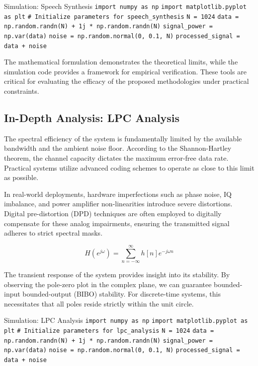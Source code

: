 \begin{pythonbox}{Simulation: Speech Synthesis}
\texttt{import numpy as np}
\texttt{import matplotlib.pyplot as plt}
\texttt{}
\texttt{\# Initialize parameters for speech\_synthesis}
\texttt{N = 1024}
\texttt{data = np.random.randn(N) + 1j * np.random.randn(N)}
\texttt{signal\_power = np.var(data)}
\texttt{noise = np.random.normal(0, 0.1, N)}
\texttt{processed\_signal = data + noise}
\end{pythonbox}

\vspace{0.5cm}
The mathematical formulation demonstrates the theoretical limits, while the simulation code provides a framework for empirical verification. These tools are critical for evaluating the efficacy of the proposed methodologies under practical constraints.


\subsection{In-Depth Analysis: LPC Analysis}
The spectral efficiency of the system is fundamentally limited by the available bandwidth and the ambient noise floor. According to the Shannon-Hartley theorem, the channel capacity dictates the maximum error-free data rate. Practical systems utilize advanced coding schemes to operate as close to this limit as possible.

In real-world deployments, hardware imperfections such as phase noise, IQ imbalance, and power amplifier non-linearities introduce severe distortions. Digital pre-distortion (DPD) techniques are often employed to digitally compensate for these analog impairments, ensuring the transmitted signal adheres to strict spectral masks.

\begin{equation}
    H(e^{j\omega}) = \sum_{n=-\infty}^{\infty} h[n] e^{-j\omega n}
\end{equation}

The transient response of the system provides insight into its stability. By observing the pole-zero plot in the complex plane, we can guarantee bounded-input bounded-output (BIBO) stability. For discrete-time systems, this necessitates that all poles reside strictly within the unit circle.

\begin{pythonbox}{Simulation: LPC Analysis}
\texttt{import numpy as np}
\texttt{import matplotlib.pyplot as plt}
\texttt{}
\texttt{\# Initialize parameters for lpc\_analysis}
\texttt{N = 1024}
\texttt{data = np.random.randn(N) + 1j * np.random.randn(N)}
\texttt{signal\_power = np.var(data)}
\texttt{noise = np.random.normal(0, 0.1, N)}
\texttt{processed\_signal = data + noise}
\end{pythonbox}

